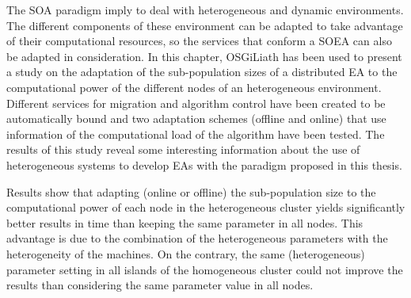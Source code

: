 

The SOA paradigm imply to deal with heterogeneous and dynamic environments. The different components of these environment can be adapted to take advantage of their computational resources, so the services that conform a SOEA can also be adapted in consideration. In this chapter, OSGiLiath has been used to present a study on the adaptation of the sub-population sizes of a distributed EA to the computational power of the different nodes of an heterogeneous environment.  Different services for migration and algorithm control have been created to be automatically bound and two adaptation schemes (offline and online) that use information of the computational load of the algorithm have been tested. The results of this study reveal some interesting information about the use of heterogeneous systems to develop EAs with the paradigm proposed in this thesis.

Results show that adapting (online or offline) the sub-po\-pu\-la\-tion size to the computational power of each node in the heterogeneous cluster yields significantly
better results in time than keeping the same parameter in all nodes. This advantage is due to the combination of the heterogeneous parameters with the heterogeneity of the machines. On the contrary, the same (heterogeneous) parameter setting in all islands of the homogeneous cluster could not improve the results than considering the same parameter value in all nodes.



